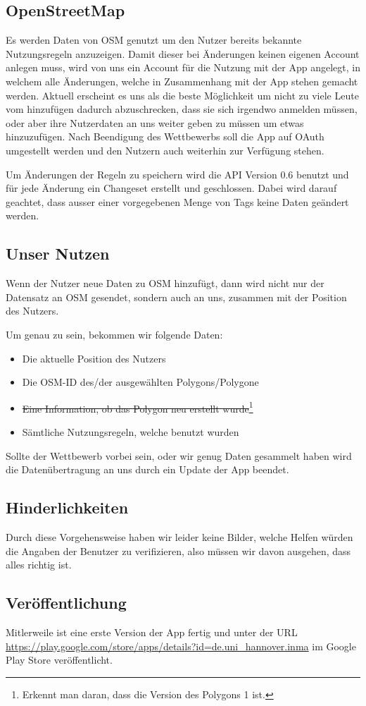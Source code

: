 \subsection{OpenStreetMap}
Es werden Daten von OSM genutzt um den Nutzer bereits bekannte Nutzungsregeln anzuzeigen.
Damit dieser bei Änderungen keinen eigenen Account anlegen muss, wird von uns ein Account für die Nutzung mit der App angelegt,
in welchem alle Änderungen, welche in Zusammenhang mit der App stehen gemacht werden.
Aktuell erscheint es uns als die beste Möglichkeit
um nicht zu viele Leute vom hinzufügen dadurch abzuschrecken, dass sie sich irgendwo anmelden müssen,
oder aber ihre Nutzerdaten an uns weiter geben zu müssen um etwas hinzuzufügen.
Nach Beendigung des Wettbewerbs soll die App auf OAuth umgestellt werden und den Nutzern auch weiterhin zur Verfügung stehen.

Um Änderungen der Regeln zu speichern wird die API Version 0.6 benutzt und für jede Änderung ein Changeset erstellt und geschlossen.
Dabei wird darauf geachtet, dass ausser einer vorgegebenen Menge von Tags keine Daten geändert werden.

\subsection{Unser Nutzen}
Wenn der Nutzer neue Daten zu OSM hinzufügt, dann wird nicht nur der Datensatz an OSM gesendet, sondern auch an uns, zusammen mit der Position des Nutzers.

Um genau zu sein, bekommen wir folgende Daten:
\begin{itemize}
\item Die aktuelle Position des Nutzers
\item Die OSM-ID des/der ausgewählten Polygons/Polygone
\item \sout{Eine Information, ob das Polygon neu erstellt wurde}\footnote{Erkennt man daran, dass die Version des Polygons 1 ist.}
\item Sämtliche Nutzungsregeln, welche benutzt wurden
\end{itemize}
Sollte der Wettbewerb vorbei sein, oder wir genug Daten gesammelt haben wird die
Datenübertragung an uns durch ein Update der App beendet.

\subsection{Hinderlichkeiten}
Durch diese Vorgehensweise haben wir leider keine Bilder, welche Helfen würden die Angaben der Benutzer zu verifizieren,
also müssen wir davon ausgehen, dass alles richtig ist.

\subsection{Veröffentlichung}
Mitlerweile ist eine erste Version der App fertig und unter der URL \url{https://play.google.com/store/apps/details?id=de.uni_hannover.inma} im Google Play Store veröffentlicht.

